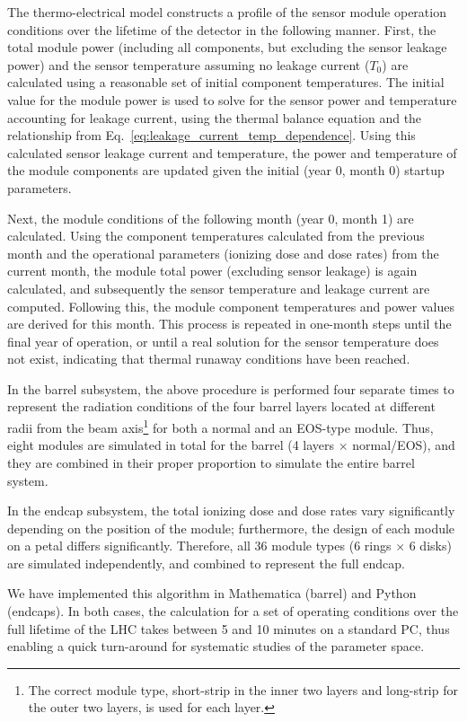 \label{sec:running}
The thermo-electrical model constructs a profile of the sensor module operation conditions over the
lifetime of the detector in the following manner. First, the total module power (including all components, but excluding the sensor
leakage power) and the sensor temperature assuming no leakage current ($T_0$) are calculated 
using a reasonable set of initial component temperatures.
The initial value for the module power is used to solve for the sensor power and temperature accounting
for leakage current, using the thermal balance equation and the relationship from
Eq.~\ref{eq:leakage_current_temp_dependence}.
Using this calculated sensor leakage current and temperature, the power and temperature of the module
components are updated given the initial (year 0, month 0) startup parameters.

Next, the module conditions of the following month (year 0, month 1) are calculated. Using the component
temperatures calculated from the previous month and the operational parameters (ionizing dose and dose
rates) from the current month, the module total power (excluding sensor leakage) is again calculated, and
subsequently the sensor temperature and leakage current are computed. Following this,
the module component temperatures and power values are derived for this month. This process is repeated in one-month
steps until the final year of operation, or until a real solution for the sensor temperature does not
exist, indicating that thermal runaway conditions have been reached.

In the barrel subsystem, the above procedure is performed four separate times to
represent the radiation conditions of the four barrel layers located at different radii from the beam axis\footnote{The correct module type, short-strip in the inner two layers and long-strip for the outer two layers, is used for each layer.} for both a normal and an EOS-type module. Thus, eight modules are simulated in total for the barrel (4 layers $\times$ normal/EOS), and they are combined in their proper proportion to simulate the entire barrel system.

In the endcap subsystem, the total ionizing dose and dose rates vary significantly depending on the
position of the module; furthermore, the design of each module on a petal differs significantly.
Therefore, all 36 module types (6 rings $\times$ 6 disks) are simulated independently, and combined to
represent the full endcap.

We have implemented this algorithm in Mathematica (barrel) and Python (endcaps). In both cases, the calculation for a set of operating conditions over the full lifetime of the LHC takes between 5 and 10 minutes on a standard PC, thus enabling a quick turn-around for systematic studies of the parameter space.

